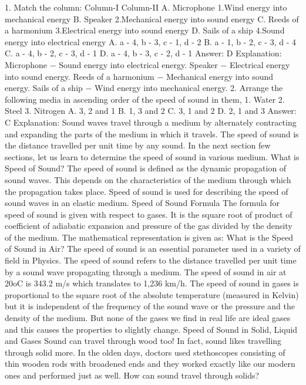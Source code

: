 1. Match the column:
Column-I Column-II
A. Microphone 1.Wind energy into mechanical energy
B. Speaker 2.Mechanical energy into sound energy
C. Reeds of a harmonium 3.Electrical energy into sound energy
D. Sails of a ship 4.Sound energy into electrical energy
A. a - 4, b - 3, c - 1, d - 2
B. a - 1, b - 2, c - 3, d - 4
C. a - 4, b - 2, c - 3, d - 1
D. a - 4, b - 3, c - 2, d - 1
Answer: D
Explanation:
Microphone − Sound energy into electrical energy.
Speaker − Electrical energy into sound energy.
Reeds of a harmonium − Mechanical energy into sound energy.
Sails of a ship − Wind energy into mechanical energy.
2. Arrange the following media in ascending order of the speed
of sound in them,
1. Water
2. Steel
3. Nitrogen
A. 3, 2 and 1
B. 1, 3 and 2
C. 3, 1 and 2
D. 2, 1 and 3
Answer: C
Explanation: Sound waves travel through a medium by alternately
contracting and expanding the parts of the medium in which it
travels. The speed of sound is the distance travelled per unit time
by any sound. In the next section few sections, let us learn to
determine the speed of sound in various medium.
What is Speed of Sound?
The speed of sound is defined as the dynamic propagation of sound
waves. This depends on the characteristics of the medium through
which the propagation takes place. Speed of sound is used for
describing the speed of sound waves in an elastic medium.
Speed of Sound Formula
The formula for speed of sound is given with respect to gases. It is
the square root of product of coefficient of adiabatic expansion and
pressure of the gas divided by the density of the medium. The
mathematical representation is given as:
What is the Speed of Sound in Air?
The speed of sound is an essential parameter used in a variety of
field in Physics. The speed of sound refers to the distance travelled
per unit time by a sound wave propagating through a medium. The
speed of sound in air at 20oC is 343.2 m/s which translates to 1,236
km/h.
The speed of sound in gases is proportional to the square root of the
absolute temperature (measured in Kelvin) but it is independent of
the frequency of the sound wave or the pressure and the density of
the medium. But none of the gases we find in real life are ideal
gases and this causes the properties to slightly change.
Speed of Sound in Solid, Liquid and Gases
Sound can travel through wood too! In fact, sound likes travelling
through solid more. In the olden days, doctors used stethoscopes
consisting of thin wooden rods with broadened ends and they worked
exactly like our modern ones and performed just as well. How can
sound travel through solids?
